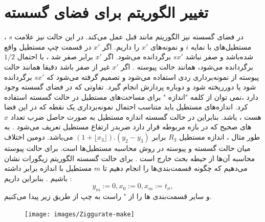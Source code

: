 \section{تغییر الگوریتم برای فضای گسسته}
در فضای گسسته نیز الگوریتم مانند قبل عمل می‌کند.  در این حالت نیز علامت $s$ ، مستطیل‌های با نمایه $i$ و نمونه‌های $x'$ را داریم. اگر $ x'$  در قسمت چپ مستطیل واقع شده‌باشد و صفر نباشد $sx'$ برگردانده می‌شود.  اگر $x'$ برابر صفر شد ، با احتمال $1/2$ برگردانده می‌شود، همانند حالت پیوسته . اگر $x'$ غیر از صفر باشد  دقیقا همانند حالت پیوسته از نمونه‌برداری ردی استفاده می‌شود و تصمیم گرفته می‌شود که $sx'$ برگردانده شود یا دورریخته شود و دوباره پردازش انجام گیرد. 
تفاوتی که در فضای گسسته وجود دارد ،نمی توان از کلمه "اندازه "  برای مساحت‌های مستطیل در حالت گسسته استفاده کرد. اندازه‌های مستطیل باید متناسب احتمال نمونه‌برداری یک نقطه که در این فضا هست ، باشد.  بنابراین در حالت گسسته اندازه مستطیل به صورت حاصل ضرب تعداد $x$ های صحیح که در بازه مربوطه قرار دارد ضربدر ارتفاع مستطیل تعریف می‌شود . به طور مثال ،  اندازه مستطیل $R_{3}$  برابر $(1 + \lfloor x_{3}\rfloor ).(y_{2} - y_{3}) $ می‌باشد.
دومین اختلاف میان حالت گسسته و پیوسته در روش محاسبه مستطیل‌ها است.  برای حالت پیوسته محاسبه آن‌ها از حیطه بحث خارج است . برای حالت گسسته الگوریتم زیگورات نشان می‌دهیم که چگونه قسمت‌بندی‌ها را انجام دهیم تا $m$ مستطیل با اندازه برابر داشته باشیم . بنابراین داریم :
\begin{equation}
y_{m} := 0, 		x_{0} := 0,		x_{m} := t_{\sigma},
\end{equation} 
 و سایر قسمت‌بندی ها را از " راست به چپ از طریق زیر پیدا می‌کنیم.
     \begin{figure}[!htb]
      	\texttt{[image: images/Ziggurate-make]}

      	\endminipage\hfill

      \end{figure}
      
